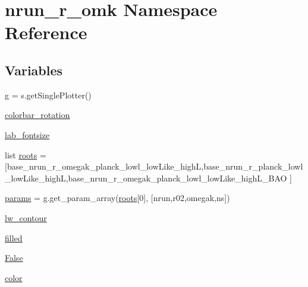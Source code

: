 \hypertarget{namespacenrun__r__omk}{}\section{nrun\+\_\+r\+\_\+omk Namespace Reference}
\label{namespacenrun__r__omk}
\subsection*{Variables}
\begin{DoxyCompactItemize}
\item 
\mbox{\hyperlink{namespacenrun__r__omk_ace7957f05ea475f5fa1de58ea051e955}{g}} = s.\+get\+Single\+Plotter()
\item 
\mbox{\hyperlink{namespacenrun__r__omk_a1f66836cc719c50aa82137839e0765d3}{colorbar\+\_\+rotation}}
\item 
\mbox{\hyperlink{namespacenrun__r__omk_aff0e36e9a82c2790be319bbecf867293}{lab\+\_\+fontsize}}
\item 
list \mbox{\hyperlink{namespacenrun__r__omk_a4e3888abd26c268bbccd4579fbd91dbc}{roots}} = \mbox{[}\textquotesingle{}base\+\_\+nrun\+\_\+r\+\_\+omegak\+\_\+planck\+\_\+lowl\+\_\+low\+Like\+\_\+highL\textquotesingle{},\textquotesingle{}base\+\_\+nrun\+\_\+r\+\_\+planck\+\_\+lowl\+\_\+low\+Like\+\_\+highL\textquotesingle{},\textquotesingle{}base\+\_\+nrun\+\_\+r\+\_\+omegak\+\_\+planck\+\_\+lowl\+\_\+low\+Like\+\_\+high\+L\+\_\+\+B\+AO\textquotesingle{} \mbox{]}
\item 
\mbox{\hyperlink{namespacenrun__r__omk_a0e679941eb4ce1622887bb4b427124de}{params}} = g.\+get\+\_\+param\+\_\+array(\mbox{\hyperlink{namespacenrun__r__omk_a4e3888abd26c268bbccd4579fbd91dbc}{roots}}\mbox{[}0\mbox{]}, \mbox{[}\textquotesingle{}nrun\textquotesingle{},\textquotesingle{}r02\textquotesingle{},\textquotesingle{}omegak\textquotesingle{},\textquotesingle{}ns\textquotesingle{}\mbox{]})
\item 
\mbox{\hyperlink{namespacenrun__r__omk_a1b5d483a8c75bf3e0617dbe0b74da4de}{lw\+\_\+contour}}
\item 
\mbox{\hyperlink{namespacenrun__r__omk_a2475e21086da276583b7b8279e4fb95d}{filled}}
\item 
\mbox{\hyperlink{namespacenrun__r__omk_aae815d4c12c623ee428135c429b7af6a}{False}}
\item 
\mbox{\hyperlink{namespacenrun__r__omk_a560a095c0da8c0532adc606c2a090ae5}{color}}
\end{DoxyCompactItemize}


